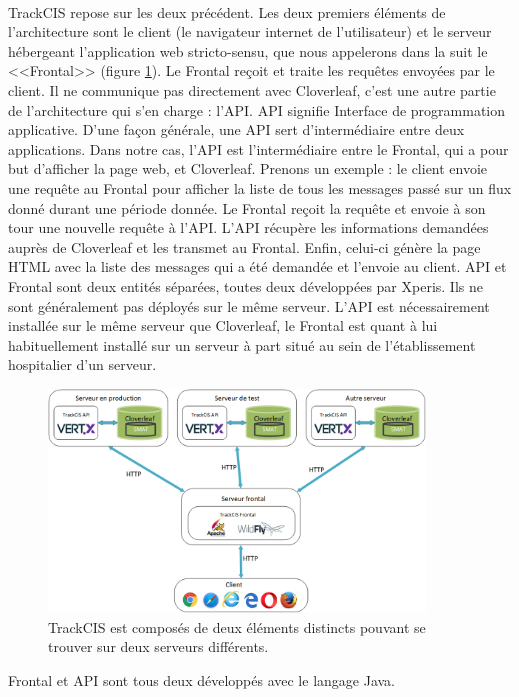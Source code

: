 			\paragraph{}%
			TrackCIS repose sur les deux précédent. Les deux
			premiers éléments de l'architecture sont le client (le navigateur internet
			de l'utilisateur) et le serveur hébergeant l'application web stricto-sensu,
			que nous appelerons dans la suit le <<Frontal>> (figure
			\ref{archi_trackcis}).
			Le Frontal reçoit et traite les requêtes envoyées par le client. Il
			ne communique pas directement avec Cloverleaf, c'est une autre partie de
			l'architecture qui s'en charge : l'API.
			API signifie Interface de programmation applicative. D'une façon générale,
			une API sert d'intermédiaire entre deux applications. Dans notre cas, l'API est
			l'intermédiaire entre le Frontal, qui a pour but d'afficher la page web, et
			Cloverleaf. Prenons un exemple : le client envoie une requête au Frontal
			pour afficher la liste de tous les messages passé sur un flux donné durant
			une période donnée. Le Frontal reçoit la requête et envoie à son tour une
			nouvelle requête à l'API.
			L'API récupère les informations demandées auprès de Cloverleaf et
			les transmet au Frontal. Enfin, celui-ci génère la page HTML avec la liste
			des messages qui a été demandée et l'envoie au client.\newline
			API et Frontal sont deux entités séparées, toutes deux développées par
			Xperis. Ils ne sont généralement pas déployés sur le même serveur. L'API est
			nécessairement installée sur le même serveur que Cloverleaf, le Frontal est
			quant à lui habituellement installé sur un serveur à part situé au
			sein de l'établissement hospitalier d'un serveur.
			\begin{figure}[H]%
				\centering
				\includegraphics[width=10cm]{../img/part3/archi_trackcis.png}
				\caption{\label{archi_trackcis} TrackCIS est composés de deux éléments
				distincts pouvant se trouver sur deux serveurs différents.}
			\end{figure}
			Frontal et API sont tous deux développés avec le langage Java.
			
